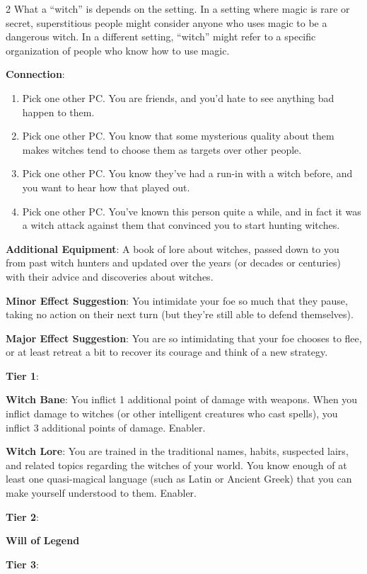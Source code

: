 \begin{multicols}{2}
What a “witch” is depends on the setting. In a setting where magic is rare or secret, superstitious people might consider anyone who uses magic to be a dangerous witch. In a different setting, “witch” might refer to a specific organization of people who know how to use magic.

\textbf{Connection}:
\begin{enumerate} 
\item Pick one other PC. You are friends, and you’d hate to see anything bad happen to them.
\item Pick one other PC. You know that some mysterious quality about them makes witches tend to choose them as targets over other people.
\item Pick one other PC. You know they’ve had a run-in with a witch before, and you want to hear how that played out.
\item Pick one other PC. You’ve known this person quite a while, and in fact it was a witch attack against them that convinced you to start hunting witches.
\end{enumerate}

\textbf{Additional Equipment}: A book of lore about witches, passed down to you from past witch hunters and updated over the years (or decades or centuries) with their advice and discoveries about witches.

\textbf{Minor Effect Suggestion}: You intimidate your foe so much that they pause, taking no action on their next turn (but they’re still able to defend themselves).

\textbf{Major Effect Suggestion}: You are so intimidating that your foe chooses to flee, or at least retreat a bit to recover its courage and think of a new strategy.

\textbf{Tier 1}:

\textbf{Witch Bane}: You inflict 1 additional point of damage with weapons. When you inflict damage to witches (or other intelligent creatures who cast spells), you inflict 3 additional points of damage. Enabler.

\textbf{Witch Lore}: You are trained in the traditional names, habits, suspected lairs, and related topics regarding the witches of your world. You know enough of at least one quasi-magical language (such as Latin or Ancient Greek) that you can make yourself understood to them. Enabler.

\textbf{Tier 2}: 

\textbf{Will of Legend} 

\textbf{Tier 3}:
 

\end{multicols}
